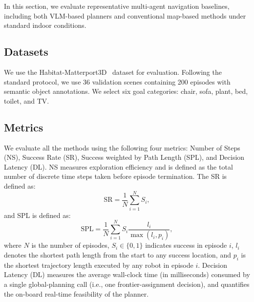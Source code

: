 In this section, we evaluate representative multi-agent navigation baselines, including both VLM-based planners and conventional map-based methods under standard indoor conditions.
\subsection{Datasets}
We use the Habitat-Matterport3D~\cite{ramakrishnan2021habitat} dataset for evaluation. Following the standard protocol, we use 36 validation scenes containing 200 episodes with semantic object annotations. We select six goal categories: chair, sofa, plant, bed, toilet, and TV.
\subsection{Metrics}
We evaluate all the methods using the following four metrics: Number of Steps (NS), Success Rate (SR), Success weighted by Path Length (SPL), and Decision Latency (DL). NS measures exploration efficiency and is defined as the total number of discrete time steps taken before episode termination. The SR is defined as:
\begin{equation}
    \mathrm{SR} = \frac{1}{N} \sum_{i=1}^{N} S_i ,
\end{equation}
and SPL is defined as:
\begin{equation}
    \mathrm{SPL} = \frac{1}{N} \sum_{i=1}^{N} 
    S_i \frac{l_i}{\max(l_i, p_i)} ,
\end{equation}
where $N$ is the number of episodes, $S_i \in \{0,1\}$ indicates success in episode $i$, $l_i$ denotes the shortest path length from the start to any success location, and $p_i$ is the shortest trajectory length executed by any robot in episode $i$. Decision Latency (DL) measures the average wall-clock time (in milliseconds) consumed by a single global-planning call (i.e., one frontier-assignment decision), and quantifies the on-board real-time feasibility of the planner.
